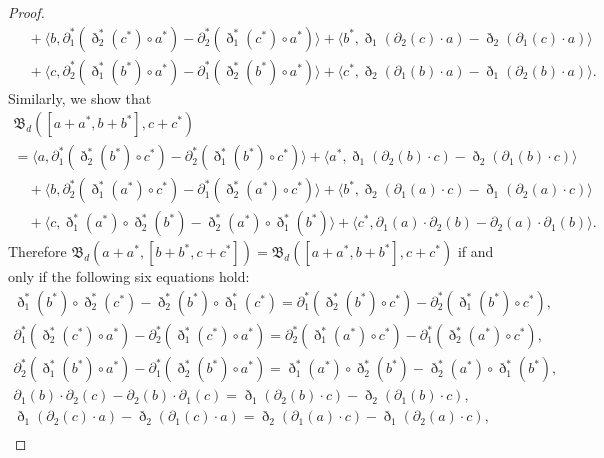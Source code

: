 \documentclass[pdftex]{sigma}
\numberwithin{equation}{section}
\begin{document}
\begin{proof}
\begin{gather*}
 \quad {}+ \langle b, \partial_1^{*}(\eth_2^{*}(c^*) \circ a^*) - \partial_2^{*}(\eth_1^{*}(c^*) \circ a^*) \rangle + \langle b^*, \eth_1(\partial_2(c) \cdot a)- \eth_2(\partial_1(c) \cdot a) \rangle \\
 \quad {}+ \langle c, \partial_2^{*}(\eth_1^{*}(b^*) \circ a^*) - \partial_1^{*}(\eth_2^{*}(b^*) \circ a^*) \rangle + \langle c^*, \eth_2(\partial_1(b) \cdot a) - \eth_1(\partial_2(b) \cdot a) \rangle.
 \end{gather*}
 Similarly, we show that
 \begin{gather*}
 \mathfrak{B}_d([a + a^*, b + b^*], c + c^*) \\
 = \langle a, \partial_1^{*}(\eth_2^{*}(b^*) \circ c^*) - \partial_2^{*}(\eth_1^{*}(b^*) \circ c^*) \rangle + \langle a^*, \eth_1(\partial_2(b) \cdot c)- \eth_2(\partial_1(b) \cdot c) \rangle \\
 \quad {}+ \langle b, \partial_2^{*}(\eth_1^{*}(a^*) \circ c^*) - \partial_1^{*}(\eth_2^{*}(a^*) \circ c^*) \rangle + \langle b^*, \eth_2(\partial_1(a) \cdot c) - \eth_1(\partial_2(a) \cdot c) \rangle \\
 \quad {}+ \langle c, \eth_1^{*}(a^*) \circ \eth_2^{*}(b^*) - \eth_2^{*}(a^*) \circ \eth_1^{*}(b^*) \rangle + \langle c^*, \partial_1(a) \cdot \partial_2(b) - \partial_2(a) \cdot \partial_1(b) \rangle.
 \end{gather*}
 Therefore $\mathfrak{B}_d(a + a^*, [b + b^*, c + c^*]) = \mathfrak{B}_d([a + a^*, b + b^*], c + c^*)$ if and only if the following six equations hold:
 \begin{gather}
 \eth_1^{*}(b^*) \circ \eth_2^{*}(c^*) - \eth_2^{*}(b^*) \circ \eth_1^{*}(c^*) = \partial_1^{*}(\eth_2^{*}(b^*) \circ c^*) - \partial_2^{*}(\eth_1^{*}(b^*) \circ c^*), \label{eq:pf151}\\
 \partial_1^{*}(\eth_2^{*}(c^*) \circ a^*) - \partial_2^{*}(\eth_1^{*}(c^*) \circ a^*) = \partial_2^{*}(\eth_1^{*}(a^*) \circ c^*) - \partial_1^{*}(\eth_2^{*}(a^*) \circ c^*), \label{eq:pf152}\\
 \partial_2^{*}(\eth_1^{*}(b^*) \circ a^*) - \partial_1^{*}(\eth_2^{*}(b^*) \circ a^*) = \eth_1^{*}(a^*) \circ \eth_2^{*}(b^*) - \eth_2^{*}(a^*) \circ \eth_1^{*}(b^*), \label{eq:pf153}\\
 \partial_1(b) \cdot \partial_2(c) - \partial_2(b) \cdot \partial_1(c) = \eth_1(\partial_2(b) \cdot c)- \eth_2(\partial_1(b) \cdot c), \label{eq:pf154}\\
 \eth_1(\partial_2(c) \cdot a)- \eth_2(\partial_1(c) \cdot a) = \eth_2(\partial_1(a) \cdot c) - \eth_1(\partial_2(a) \cdot c), \label{eq:pf155}\\

\end{gather}
\end{proof}
\end{document}
